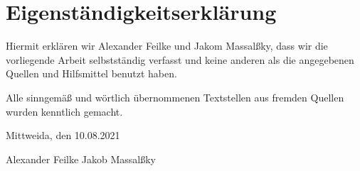 \documentclass[a4paper,10pt,ngerman,fontsize=12pt]{scrreprt}
\begin{document}
\chapter{Eigenständigkeitserklärung}
Hiermit erklären wir Alexander Feilke und Jakom Massal{\ss}ky, dass wir die vorliegende Arbeit selbstständig verfasst und keine anderen als die angegebenen Quellen und Hilfsmittel benutzt haben.

Alle sinngemä{\ss} und wörtlich übernommenen Textstellen aus fremden Quellen wurden kenntlich gemacht.

Mittweida, den 10.08.2021

\vspace{2cm}

Alexander Feilke \hspace{4cm} Jakob Massal{\ss}ky
\end{document}
